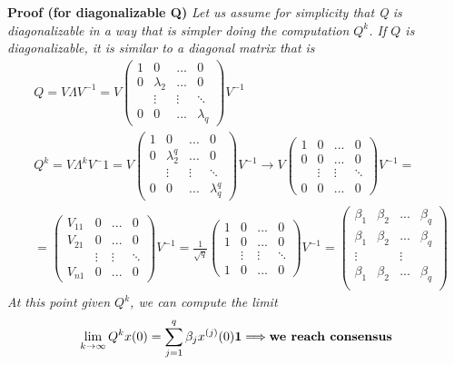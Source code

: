 \noindent
\textbf{Proof (for diagonalizable Q)}
\textit{
    Let us assume for simplicity that Q is diagonalizable in a way that is simpler doing the computation $Q^k$. If $Q$ is diagonalizable, it is similar to a diagonal matrix that is
    \begin{align*}
        &Q=V \Lambda V^{-1}
         = V \begin{pmatrix}
            1&0&...&0\\
            0&\lambda_2&...&0\\
            &\vdots&\vdots&\ddots\\
            0&0&...&\lambda_q
         \end{pmatrix} V^{-1}\\
         &Q^{k}=V \Lambda^k V^-1 = V \begin{pmatrix}
            1&0&...&0\\
            0&\lambda_2^q&...&0\\
            &\vdots&\vdots&\ddots\\
            0&0&...&\lambda_q^q
        \end{pmatrix} V^{-1} \to
        V \begin{pmatrix}
            1&0&...&0\\
            0&0&...&0\\
            &\vdots&\vdots&\ddots\\
            0&0&...&0
        \end{pmatrix} V^{-1}=\\
        &=\begin{pmatrix}
            V_{11}&0&...&0\\
            V_{21}&0&...&0\\
            &\vdots&\vdots&\ddots\\
            V_{n1}&0&...&0
        \end{pmatrix} V^{-1}=\frac{1}{\sqrt{q}}\begin{pmatrix}
            1&0&...&0\\
            1&0&...&0\\
            &\vdots&\vdots&\ddots\\
            1&0&...&0
        \end{pmatrix} V^{-1}=\begin{pmatrix}
            \beta_1&\beta_2&...&\beta_q\\
            \beta_1&\beta_2&...&\beta_q\\
            \vdots& & \vdots\\
            \beta_1&\beta_2&...&\beta_q\\
        \end{pmatrix}
    \end{align*} 
    At this point given $Q^k$, we can compute the limit
    \begin{equation*}
        \lim_{k\to\infty} Q^kx(0)=\sum_{j=1}^q \beta_j x^{(j)}(0) \mathbf{1} \Longrightarrow \text{\textbf{we reach consensus}}
    \end{equation*}
} 

